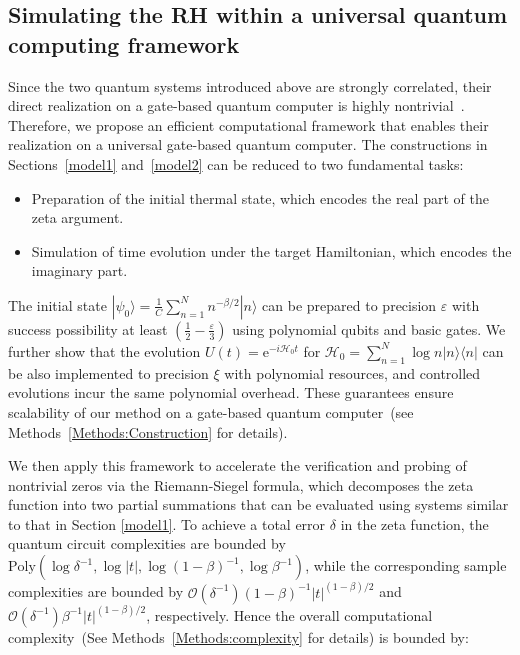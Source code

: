 \documentclass[aps,pra,twocolumn,superscriptaddress,preprintnumbers,amsmath,amssymb]{revtex4-2}
\begin{document}
\subsection{Simulating the RH within a universal quantum computing framework}\label{QC}


Since the two quantum systems introduced above are strongly correlated, their direct realization on a gate-based quantum computer is highly nontrivial~\cite{efficent2025}.  Therefore, we propose an efficient computational framework that enables their realization on a universal gate-based quantum computer. The constructions  in Sections~\ref{model1} and~\ref{model2} can be reduced to two fundamental tasks: 
\begin{itemize}
    \item[(i)] Preparation of the initial thermal state, which encodes the real part %
    of the  zeta argument.
    \item[(ii)] Simulation of time evolution under the target Hamiltonian, which encodes the imaginary part.
\end{itemize}
 The  initial state  $|\psi_0\rangle=\tfrac{1}{C}\textstyle\sum_{n=1}^{N}n^{-\beta/2}|n\rangle$ can be prepared to precision $\varepsilon$ with success possibility at least $(\frac{1}{2}-\tfrac{\varepsilon}{3})$ using polynomial qubits and basic gates.  We further show that the evolution $U(t)=\mathrm{e}^{-i\mathcal{H}_0t}$ for $\mathcal{H}_0=\textstyle\sum_{n=1}^N \log n|n\rangle\langle n|$ can be also implemented to precision $\xi$ with polynomial resources, and controlled evolutions incur the same polynomial overhead. These guarantees ensure scalability of our method on a gate-based quantum computer~(see Methods~\ref{Methods:Construction} for details).\par
 We then apply this framework to accelerate the verification and probing of nontrivial zeros via the Riemann-Siegel formula, which decomposes the zeta function into two partial summations that can be evaluated  using systems similar to that in Section \ref{model1}. To achieve a total error $\delta$ in the zeta function,  the quantum circuit complexities are bounded by $\mathrm{Poly}(\log \delta^{-1},\log |t|,\log(1-\beta)^{-1},\log \beta^{-1})$, while the corresponding sample complexities are bounded by $\mathcal{O}(\delta^{-1})(1-\beta)^{-1}|t|^{(1-\beta)/2}$ and $\mathcal{O}(\delta^{-1})\beta^{-1}|t|^{(1-\beta)/2}$, respectively. Hence the overall computational complexity~(See Methods~\ref{Methods:complexity} for details) is bounded by:
\end{document}
